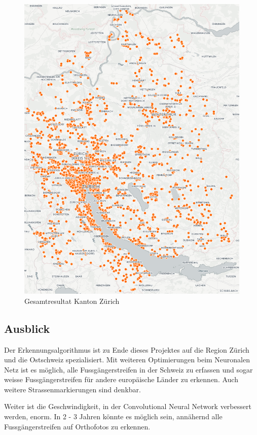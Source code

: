 \\
\begin{figure}[H]
	\centering
	\includegraphics[width=\textwidth -80mm]{images/karte.png}
	\caption{Gesamtresultat Kanton Zürich}
\end{figure}

\subsection*{Ausblick}
Der Erkennungsalgorithmus ist zu Ende dieses Projektes auf die Region Zürich und die Ostschweiz spezialisiert. Mit weiteren Optimierungen beim Neuronalen Netz ist es möglich, alle Fussgängerstreifen in der Schweiz zu erfassen und sogar weisse Fussgängerstreifen für andere europäische Länder zu erkennen. Auch weitere Strassenmarkierungen sind denkbar.

Weiter ist die Geschwindigkeit, in der Convolutional Neural Network verbessert werden, enorm. In 2 - 3 Jahren könnte es möglich sein, annähernd alle Fussgängerstreifen auf Orthofotos zu erkennen.
\newpage